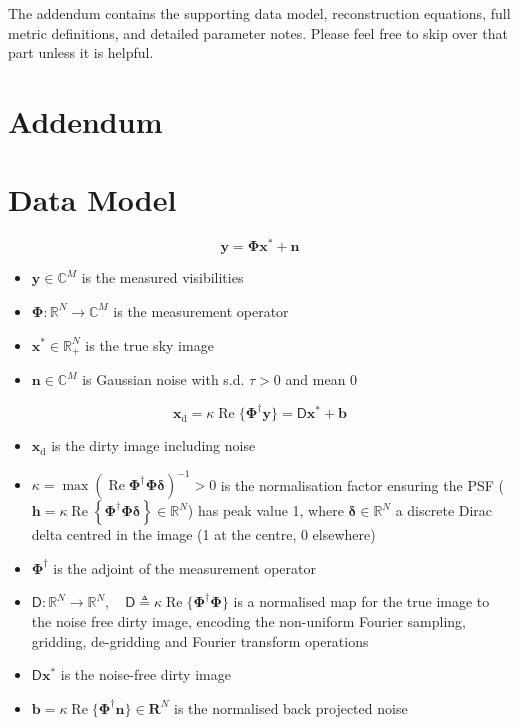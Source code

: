 \documentclass[11pt]{article}
\newcommand{\D}{\boldsymbol{\mathsf D}}
\newcommand{\dirty}{\boldsymbol x_{\text{d}}}
\newcommand{\true}{\boldsymbol{x^{*}}}
\newcommand{\noise}{\boldsymbol{b}}
\begin{document}
The addendum contains the supporting data model, reconstruction equations, full metric definitions, and detailed parameter notes.
Please feel free to skip over that part unless it is helpful.

\appendix
\section*{Addendum}

\section{Data Model}
\label{sec:data-model}

\begin{equation}
\boldsymbol y = \boldsymbol\Phi \true + \boldsymbol n
\end{equation}
\begin{itemize}
    \item $\boldsymbol y\in \mathbb C^M$ is the measured visibilities
    \item $\boldsymbol\Phi: \mathbb R^N \to \mathbb C^M$  is the measurement operator
    \item $\true\in\mathbb R_+^N$ is the true sky image
    \item $\boldsymbol n\in\mathbb C^M$ is Gaussian noise with s.d. $\tau>0$ and mean $0$
\end{itemize}

\begin{equation}
\dirty = \kappa\operatorname{Re}\{\boldsymbol\Phi^\dagger \boldsymbol y\} = \D\true + \noise
\end{equation}

\begin{itemize}
    \item $\dirty$ is the dirty image including noise
    \item $\kappa=\max(\operatorname{Re}{\boldsymbol\Phi^\dagger\boldsymbol\Phi\boldsymbol\delta})^{-1}>0$ is the normalisation factor ensuring the PSF ($\boldsymbol{h}=\kappa \operatorname{Re}\left\{\boldsymbol{\Phi}^{\dagger} \boldsymbol{\Phi} \boldsymbol{\delta}\right\} \in \mathbb{R}^N$) has peak value 1, where $\boldsymbol{\mathbf\delta} \in \mathbb R^N$ a discrete Dirac delta centred in the image (1 at the centre, 0 elsewhere)
    \item $\boldsymbol\Phi^\dagger$ is the adjoint of the measurement operator
    \item $\D:\mathbb R^N\to\mathbb R^N,\quad \D \triangleq \kappa\operatorname{Re}\{\boldsymbol{\Phi}^{\dagger}\boldsymbol{\Phi}\}$ is a normalised map for the true image to the noise free dirty image, encoding the non-uniform Fourier sampling, gridding, de-gridding and Fourier transform operations
    \item $\D\true$ is the noise-free dirty image
    \item $\noise = \kappa\operatorname{Re}\{\boldsymbol\Phi^\dagger\boldsymbol n\}\in\mathbf R^N$ is the normalised back projected noise
\end{itemize}
\end{document}
